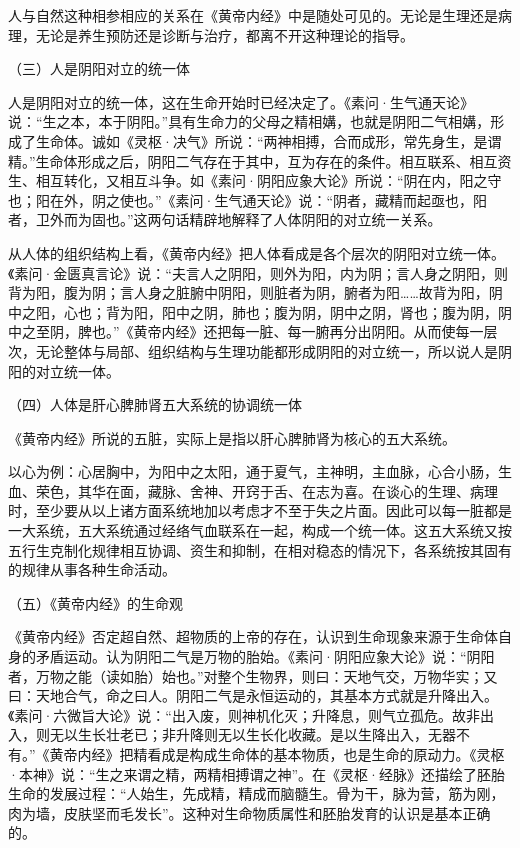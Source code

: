 \documentclass[12pt,UTF8]{ctexbook}
\begin{document}
人与自然这种相参相应的关系在《黄帝内经》中是随处可见的。无论是生理还是病理，无论是养生预防还是诊断与治疗，都离不开这种理论的指导。

（三）人是阴阳对立的统一体

人是阴阳对立的统一体，这在生命开始时已经决定了。《素问·生气通天论》说：“生之本，本于阴阳。”具有生命力的父母之精相媾，也就是阴阳二气相媾，形成了生命体。诚如《灵枢·决气》所说：“两神相搏，合而成形，常先身生，是谓精。”生命体形成之后，阴阳二气存在于其中，互为存在的条件。相互联系、相互资生、相互转化，又相互斗争。如《素问·阴阳应象大论》所说：“阴在内，阳之守也；阳在外，阴之使也。”《素问·生气通天论》说：“阴者，藏精而起亟也，阳者，卫外而为固也。”这两句话精辟地解释了人体阴阳的对立统一关系。

从人体的组织结构上看，《黄帝内经》把人体看成是各个层次的阴阳对立统一体。《素问·金匮真言论》说：“夫言人之阴阳，则外为阳，内为阴；言人身之阴阳，则背为阳，腹为阴；言人身之脏腑中阴阳，则脏者为阴，腑者为阳……故背为阳，阴中之阳，心也；背为阳，阳中之阴，肺也；腹为阴，阴中之阴，肾也；腹为阴，阴中之至阴，脾也。”《黄帝内经》还把每一脏、每一腑再分出阴阳。从而使每一层次，无论整体与局部、组织结构与生理功能都形成阴阳的对立统一，所以说人是阴阳的对立统一体。

（四）人体是肝心脾肺肾五大系统的协调统一体

《黄帝内经》所说的五脏，实际上是指以肝心脾肺肾为核心的五大系统。

以心为例：心居胸中，为阳中之太阳，通于夏气，主神明，主血脉，心合小肠，生血、荣色，其华在面，藏脉、舍神、开窍于舌、在志为喜。在谈心的生理、病理时，至少要从以上诸方面系统地加以考虑才不至于失之片面。因此可以每一脏都是一大系统，五大系统通过经络气血联系在一起，构成一个统一体。这五大系统又按五行生克制化规律相互协调、资生和抑制，在相对稳态的情况下，各系统按其固有的规律从事各种生命活动。

（五）《黄帝内经》的生命观

《黄帝内经》否定超自然、超物质的上帝的存在，认识到生命现象来源于生命体自身的矛盾运动。认为阴阳二气是万物的胎始。《素问·阴阳应象大论》说：“阴阳者，万物之能（读如胎）始也。”对整个生物界，则曰：天地气交，万物华实；又曰：天地合气，命之曰人。阴阳二气是永恒运动的，其基本方式就是升降出入。《素问·六微旨大论》说：“出入废，则神机化灭；升降息，则气立孤危。故非出入，则无以生长壮老已；非升降则无以生长化收藏。是以生降出入，无器不有。”《黄帝内经》把精看成是构成生命体的基本物质，也是生命的原动力。《灵枢·本神》说：“生之来谓之精，两精相搏谓之神”。在《灵枢·经脉》还描绘了胚胎生命的发展过程：“人始生，先成精，精成而脑髓生。骨为干，脉为营，筋为刚，肉为墙，皮肤坚而毛发长”。这种对生命物质属性和胚胎发育的认识是基本正确的。
\end{document}

